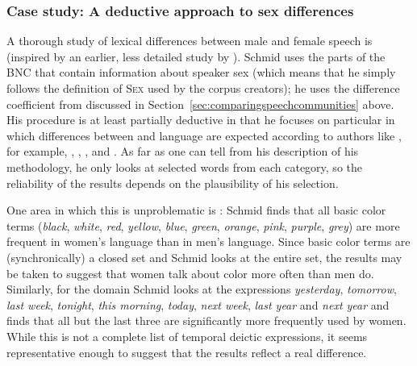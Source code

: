 \subsubsection{Case study: A deductive approach to sex differences}
\label{sec:adeductiveapproachtosexdifferences}

A thorough study of lexical differences between male and female speech  is \citet{schmid_women_2003} (inspired by an earlier, less detailed study by \citealt{rayson_social_1997}). Schmid uses the parts of the BNC  that contain information about speaker sex (which means that he simply follows the definition of \textsc{Sex} used by the corpus creators); he uses the difference coefficient from \citet{johansson_frequency_1989} discussed in Section~\ref{sec:comparingspeechcommunities} above. His procedure is at least partially deductive  in that he focuses on particular  in which differences between  and  language are expected  according to authors like \citet{lakoff_language_1973}, for example, , , ,  and . As far as one can tell from his description of his methodology, he only looks at selected words from each category, so the reliability  of the results depends on the plausibility of his selection.

One area in which this is unproblematic is : Schmid finds that all basic color terms (\textit{black}, \textit{white}, \textit{red}, \textit{yellow}, \textit{blue}, \textit{green}, \textit{orange}, \textit{pink}, \textit{purple}, \textit{grey}) are more frequent in women's language than in men's language.  Since basic color terms are (synchronically) a closed set and Schmid looks at the entire set, the results may be taken to suggest that women talk about color more often than men do. Similarly, for the domain  Schmid looks at the expressions \textit{yesterday}, \textit{tomorrow}, \textit{last week}, \textit{tonight}, \textit{this morning}, \textit{today}, \textit{next week}, \textit{last year} and \textit{next year} and finds that all but the last three are significantly more frequently used by women. While this is not a complete list of temporal deictic expressions, it seems representative  enough to suggest that the results reflect a real difference.

